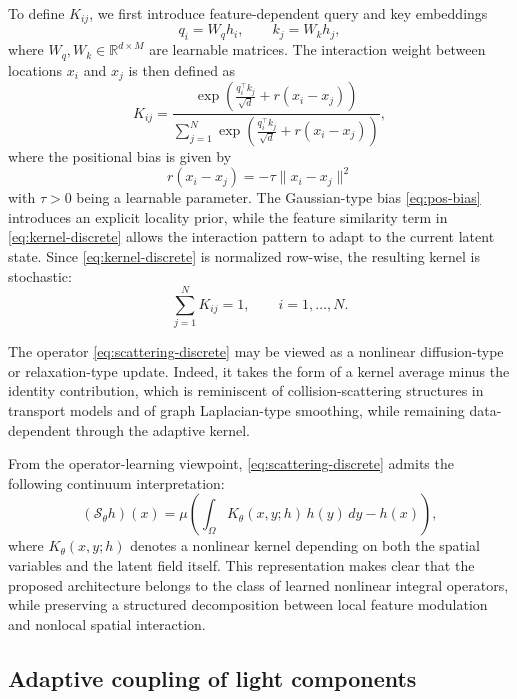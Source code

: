 \documentclass{article}
\begin{document}
To define $K_{ij}$, we first introduce feature-dependent query and key embeddings
\begin{equation}
q_i = W_q h_i,
\qquad
k_j = W_k h_j,
\end{equation}
where $W_q, W_k \in \mathbb{R}^{d \times M}$ are learnable matrices. The interaction weight between locations $x_i$ and $x_j$ is then defined as
\begin{equation}
K_{ij}
=
\frac{
\exp\!\left(
\frac{q_i^\top k_j}{\sqrt{d}} + r(x_i-x_j)
\right)
}{
\sum_{j=1}^N
\exp\!\left(
\frac{q_i^\top k_{j}}{\sqrt{d}} + r(x_i-x_{j})
\right)
},
\label{eq:kernel-discrete}
\end{equation}
where the positional bias is given by
\begin{equation}
r(x_i-x_j)
=
-\tau \|x_i-x_j\|^2
\label{eq:pos-bias}
\end{equation}
with $\tau > 0$ being a learnable parameter. The Gaussian-type bias \eqref{eq:pos-bias} introduces an explicit locality prior, while the feature similarity term in \eqref{eq:kernel-discrete} allows the interaction pattern to adapt to the current latent state. Since \eqref{eq:kernel-discrete} is normalized row-wise, the resulting kernel is stochastic:
\begin{equation}
\sum_{j=1}^N K_{ij} = 1,
\qquad i=1,\dots,N.
\end{equation}

The operator \eqref{eq:scattering-discrete} may be viewed as a nonlinear diffusion-type or relaxation-type update. Indeed, it takes the form of a kernel average minus the identity contribution, which is reminiscent of collision-scattering structures in transport models and of graph Laplacian-type smoothing, while remaining data-dependent through the adaptive kernel.

From the operator-learning viewpoint, \eqref{eq:scattering-discrete} admits the following continuum interpretation:
\begin{equation}
(\mathcal{S}_\theta h)(x)
=
\mu
\left(
\int_\Omega
K_\theta(x,y;h)\, h(y)\, dy
-
h(x)
\right),
\label{eq:scattering-continuous}
\end{equation}
where $K_\theta(x,y;h)$ denotes a nonlinear kernel depending on both the spatial variables and the latent field itself. This representation makes clear that the proposed architecture belongs to the class of learned nonlinear integral operators, while preserving a structured decomposition between local feature modulation and nonlocal spatial interaction.

\subsection{Adaptive coupling of light components}
\end{document}
